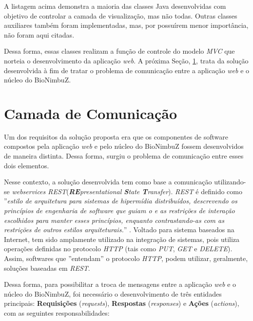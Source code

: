 A listagem acima demonstra a maioria das classes Java desenvolvidas com objetivo de controlar a camada de visualização, mas não todas. Outras classes auxiliares também foram implementadas, mas, por possuírem menor importância, não foram aqui citadas.

Dessa forma, essas classes realizam a função de controle do modelo \textit{MVC} que norteia o desenvolvimento da aplicação \textit{web}. A próxima Seção, \ref{cap5sec4}, trata da solução desenvolvida à fim de tratar o problema de comunicação entre a aplicação \textit{web} e o núcleo do BioNimbuZ.



\section{Camada de Comunicação} \label{cap5sec4}

Um dos requisitos da solução proposta era que os componentes de software compostos pela aplicação \textit{web} e pelo núcleo do BioNimbuZ fossem desenvolvidos de maneira distinta. Dessa forma, surgiu o problema de comunicação entre esses dois elementos.

Nesse contexto, a solução desenvolvida tem como base a comunicação utilizando-se \textit{webservices REST}(\textit{\textbf{RE}presentational \textbf{S}tate \textbf{T}ransfer}). \textit{REST} é definido como ''\textit{estilo de arquitetura para sistemas de hipermídia distribuídos, descrevendo os princípios de engenharia de software que guiam o  e as restrições de interação escolhidos para manter esses princípios, enquanto contrastando-as com as restrições de outros estilos arquiteturais.}'' \cite{rest}. Voltado para sistema baseados na Internet, tem sido amplamente utilizado na integração de sistemas, pois utiliza operações definidas no protocolo \textit{HTTP} (tais como \textit{PUT}, \textit{GET} e \textit{DELETE}). Assim, softwares que ''entendam'' o protocolo \textit{HTTP}, podem utilizar, geralmente, soluções baseadas em \textit{REST}.

Dessa forma, para possibilitar a troca de mensagens entre a aplicação \textit{web} e o núcleo do BioNimbuZ, foi necessário o desenvolvimento de três entidades principais: \textbf{Requisições} (\textit{requests}), \textbf{Respostas} (\textit{responses}) e \textbf{Ações} (\textit{actions}), com as seguintes responsabilidades:

